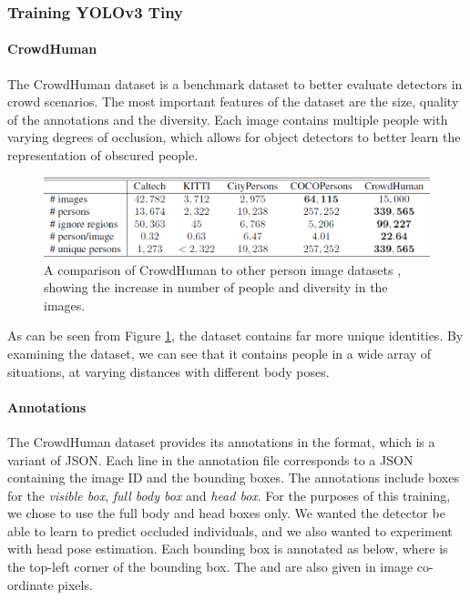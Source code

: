 \subsubsection{Training YOLOv3 Tiny}
\paragraph{CrowdHuman} The CrowdHuman dataset \cite{Shao} is a benchmark dataset to better evaluate detectors in crowd scenarios. The most important features of the dataset are the size, quality of the annotations and the diversity. Each image contains multiple people with varying degrees of occlusion, which allows for object detectors to better learn the representation of obscured people. 

\begin{figure}[ht]
	\centering
	\includegraphics[width=0.9\linewidth]{img/chapter5_implementation/crowdHumanStats.png}
	\caption{A comparison of CrowdHuman to other person image datasets \cite{Shao}, showing the increase in number of people and diversity in the images.}
	\label{fig:crowdHumanStats}
\end{figure}

As can be seen from Figure \ref{fig:crowdHumanStats}, the dataset contains far more unique identities. By examining the dataset, we can see that it contains people in a wide array of situations, at varying distances with different body poses.

\paragraph{Annotations} The CrowdHuman dataset provides its annotations in the  format, which is a variant of JSON. Each line in the annotation file corresponds to a JSON containing the image ID and the bounding boxes. The annotations include boxes for the \textit{visible box}, \textit{full body box} and \textit{head box}. For the purposes of this training, we chose to use the full body and head boxes only. We wanted the detector be able to learn to predict occluded individuals, and we also wanted to experiment with head pose estimation. Each bounding box is annotated as below, where  is the top-left corner of the bounding box. The  and  are also given in image co-ordinate pixels.

